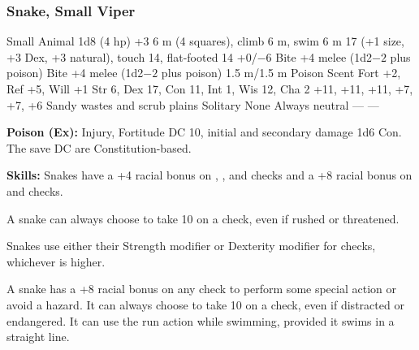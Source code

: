 \subsubsection{Snake, Small Viper}
\begin{MonsterStats}
{Small Animal}
{1d8 (4 hp)}
{+3}
{6 m (4 squares), climb 6 m, swim 6 m}
{17 (+1 size, +3 Dex, +3 natural), touch 14, flat-footed 14}
{+0/$-6$}
{Bite +4 melee (1d2$-2$ plus poison)}
{Bite +4 melee (1d2$-2$ plus poison)}
{1.5 m/1.5 m}
{Poison}
{Scent}
{Fort +2, Ref +5, Will +1}
{Str 6, Dex 17, Con 11, Int 1, Wis 12, Cha 2}
{ +11,  +11,  +11,  +7,  +7,  +6}
{}
{Sandy wastes and scrub plains}
{Solitary}
{\onehalf}
{None}
{Always neutral}
{---}
{---}
\end{MonsterStats}

\textbf{Poison (Ex):} Injury, Fortitude DC 10, initial and secondary damage 1d6 Con. The save DC are Constitution-based.

\textbf{Skills:} Snakes have a +4 racial bonus on , , and  checks and a +8 racial bonus on  and  checks.

A snake can always choose to take 10 on a  check, even if rushed or threatened.

Snakes use either their Strength modifier or Dexterity modifier for  checks, whichever is higher.

A snake has a +8 racial bonus on any  check to perform some special action or avoid a hazard. It can always choose to take 10 on a  check, even if distracted or endangered. It can use the run action while swimming, provided it swims in a straight line.
